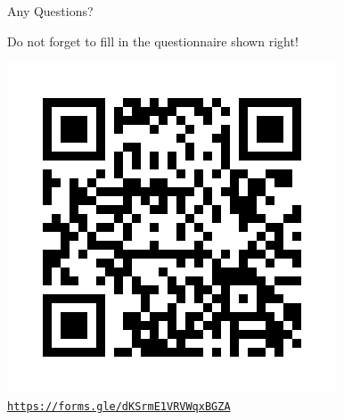 \documentclass[aspectratio=169, 12pt, xcolor=table]{beamer}
\newcommand{\ohref}[1]{\href{#1}{\texttt{#1}}}
\begin{document}
	\begin{frame}{Any Questions?}
		\begin{minipage}{0.35\textwidth}
			\raggedright
			Do not forget to fill in the questionnaire shown right!
		\end{minipage}\hfill
		\begin{minipage}{0.58\textwidth}
			\vspace{0pt}
			\raggedleft
			\includegraphics[scale=0.4]{../../assets/post_lesson_assessment.png}
			\centering
			\ohref{https://forms.gle/dKSrmE1VRVWqxBGZA}
		\end{minipage}
	\end{frame}
	
\end{document}
